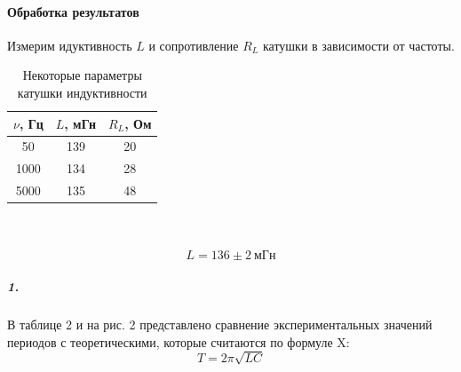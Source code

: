 \documentclass[a4paper,12pt]{article}
\begin{document}
\paragraph{Обработка результатов\\}
Измерим идуктивность $L$ и сопротивление $R_L$ катушки в зависимости от частоты.
\begin{table}[h!]
\begin{center}

\begin{tabular}{|c|c|c|}
\hline
$\nu$, Гц & $L$, мГн & $R_L$, Ом \\ \hline
50        & 139    & 20      \\ \hline
1000      & 134    & 28      \\ \hline
5000      & 135    & 48      \\ \hline
\end{tabular}
\caption{Некоторые параметры катушки индуктивности}
\end{center}
\end{table} \\ \\
\[L = 136\pm 2~ мГн\]
\subparagraph{1.}
В таблице 2 и на рис. 2 представлено сравнение экспериментальных значений периодов с теоретическими, которые считаются по формуле X:
\begin{equation}
    T=2\pi \sqrt{LC}
\end{equation}
\end{document}
